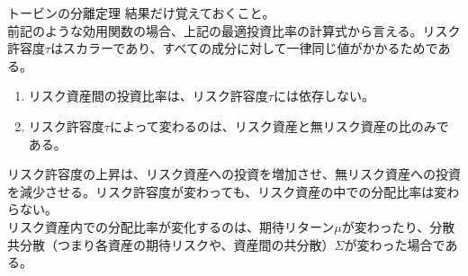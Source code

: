 \documentclass[dvipdfmx,autodetect-engine, unicode, 10pt, aspectratio=169]{beamer}
\begin{document}
\begin{frame}{トービンの分離定理}
    結果だけ覚えておくこと。\\
    前記のような効用関数の場合、上記の最適投資比率の計算式から言える。リスク許容度$\tau$はスカラーであり、すべての成分に対して一律同じ値がかかるためである。
    \begin{enumerate}
        \item リスク資産間の投資比率は、リスク許容度$\tau$には依存しない。
        \item リスク許容度$\tau$によって変わるのは、リスク資産と無リスク資産の比のみである。
    \end{enumerate}
    リスク許容度の上昇は、リスク資産への投資を増加させ、無リスク資産への投資を減少させる。リスク許容度が変わっても、リスク資産の中での分配比率は変わらない。    \\
    リスク資産内での分配比率が変化するのは、期待リターン$\mu$が変わったり、分散共分散（つまり各資産の期待リスクや、資産間の共分散）$\Sigma$が変わった場合である。
\end{frame}
\end{document}
